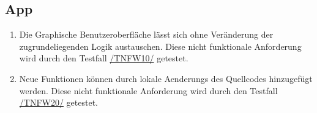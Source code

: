 \subsection*{App}

\begin{samepage}
    \begin{enumerate}[label=\textbf{/NFW\arabic*0/}, align=left]
        \item \label{/NFW10/} Die Graphische Benutzeroberfläche lässt sich ohne Veränderung der zugrundeliegenden Logik austauschen. Diese nicht funktionale Anforderung wird durch den Testfall \hyperref[/TNFW10/]{/TNFW10/} getestet.
        \item \label{/NFW20/} Neue Funktionen können durch \glspl{lokale Aenderung} des \Gls{Quellcode}s hinzugefügt werden. Diese nicht funktionale Anforderung wird durch den Testfall \hyperref[/TNFW20/]{/TNFW20/} getestet.
    \end{enumerate}
\end{samepage}